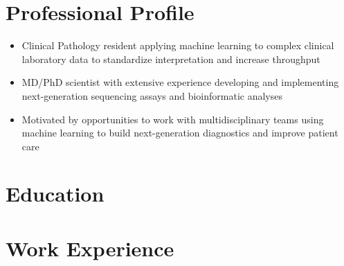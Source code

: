 \documentclass[11pt,a4paper,]{moderncv}
\begin{document}
\makecvtitle



\hypertarget{professional-profile}{%
\section{Professional Profile}\label{professional-profile}}

\begin{itemize}[leftmargin = 3 cm]
  \item Clinical Pathology resident applying machine learning to
    complex clinical laboratory data to standardize
    interpretation and increase throughput

  \item MD/PhD scientist with extensive experience developing
    and implementing next-generation sequencing assays and
    bioinformatic analyses

  \item Motivated by opportunities to work with
    multidisciplinary teams using machine learning to build
    next-generation diagnostics and improve patient care

\end{itemize}

\vspace{0 pt}

\hypertarget{education}{%
\section{Education}\label{education}}

\nopagebreak

\hypertarget{work-experience}{%
\section{Work Experience}\label{work-experience}}
\end{document}
